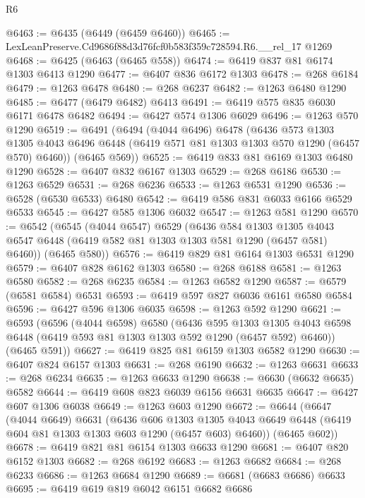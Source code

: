 \begin{lexlean}{R6}
\begin{coremodule}
@6463 := @6435 (@6449 (@6459 @6460))
@6465 := LexLeanPreserve.Cd9686f88d3d76fcf0b583f359c728594.R6.__rel_17 @1269
@6468 := @6425 (@6463 (@6465 @558))
@6474 := @6419 @837 @81 @6174 @1303 @6413 @1290
@6477 := @6407 @836 @6172 @1303
@6478 := @268 @6184
@6479 := @1263 @6478
@6480 := @268 @6237
@6482 := @1263 @6480 @1290
@6485 := @6477 (@6479 @6482) @6413
@6491 := @6419 @575 @835 @6030 @6171 @6478 @6482
@6494 := @6427 @574 @1306 @6029
@6496 := @1263 @570 @1290
@6519 := @6491
    (@6494
      (@4044 @6496)
      @6478
      (@6436
        @573
        @1303
        @1305
        @4043
        @6496
        @6448
        (@6419 @571 @81 @1303 @1303 @570 @1290 (@6457 @570) @6460))
      (@6465 @569))
@6525 := @6419 @833 @81 @6169 @1303 @6480 @1290
@6528 := @6407 @832 @6167 @1303
@6529 := @268 @6186
@6530 := @1263 @6529
@6531 := @268 @6236
@6533 := @1263 @6531 @1290
@6536 := @6528 (@6530 @6533) @6480
@6542 := @6419 @586 @831 @6033 @6166 @6529 @6533
@6545 := @6427 @585 @1306 @6032
@6547 := @1263 @581 @1290
@6570 := @6542
    (@6545
      (@4044 @6547)
      @6529
      (@6436
        @584
        @1303
        @1305
        @4043
        @6547
        @6448
        (@6419 @582 @81 @1303 @1303 @581 @1290 (@6457 @581) @6460))
      (@6465 @580))
@6576 := @6419 @829 @81 @6164 @1303 @6531 @1290
@6579 := @6407 @828 @6162 @1303
@6580 := @268 @6188
@6581 := @1263 @6580
@6582 := @268 @6235
@6584 := @1263 @6582 @1290
@6587 := @6579 (@6581 @6584) @6531
@6593 := @6419 @597 @827 @6036 @6161 @6580 @6584
@6596 := @6427 @596 @1306 @6035
@6598 := @1263 @592 @1290
@6621 := @6593
    (@6596
      (@4044 @6598)
      @6580
      (@6436
        @595
        @1303
        @1305
        @4043
        @6598
        @6448
        (@6419 @593 @81 @1303 @1303 @592 @1290 (@6457 @592) @6460))
      (@6465 @591))
@6627 := @6419 @825 @81 @6159 @1303 @6582 @1290
@6630 := @6407 @824 @6157 @1303
@6631 := @268 @6190
@6632 := @1263 @6631
@6633 := @268 @6234
@6635 := @1263 @6633 @1290
@6638 := @6630 (@6632 @6635) @6582
@6644 := @6419 @608 @823 @6039 @6156 @6631 @6635
@6647 := @6427 @607 @1306 @6038
@6649 := @1263 @603 @1290
@6672 := @6644
    (@6647
      (@4044 @6649)
      @6631
      (@6436
        @606
        @1303
        @1305
        @4043
        @6649
        @6448
        (@6419 @604 @81 @1303 @1303 @603 @1290 (@6457 @603) @6460))
      (@6465 @602))
@6678 := @6419 @821 @81 @6154 @1303 @6633 @1290
@6681 := @6407 @820 @6152 @1303
@6682 := @268 @6192
@6683 := @1263 @6682
@6684 := @268 @6233
@6686 := @1263 @6684 @1290
@6689 := @6681 (@6683 @6686) @6633
@6695 := @6419 @619 @819 @6042 @6151 @6682 @6686

\end{coremodule}
\end{lexlean}
